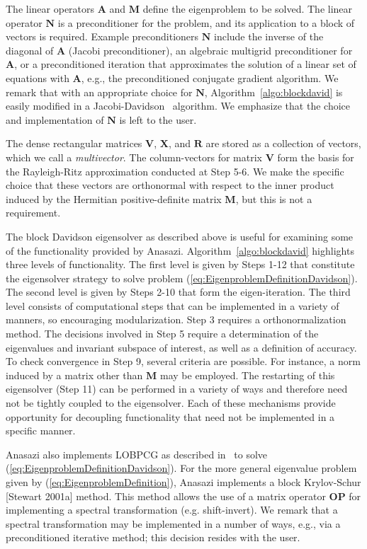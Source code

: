 \documentclass[acmtoms,acmnow]{acmtrans2m}
\begin{document}
The linear operators $\mathbf{A}$ and $\mathbf{M}$ define the
eigenproblem to be solved. The linear operator $\mathbf{N}$ is a
preconditioner for the problem, and its application to a block of
vectors is required. Example preconditioners $\mathbf{N}$ include
the inverse of the diagonal of $\mathbf{A}$ (Jacobi preconditioner),
an algebraic multigrid preconditioner for $\mathbf{A}$, or a
preconditioned iteration that approximates the solution of a linear
set of equations with $\mathbf{A}$, e.g., the preconditioned
conjugate gradient algorithm. We remark that with an appropriate
choice for $\mathbf{N}$, Algorithm~\ref{algo:blockdavid} is easily
modified in a Jacobi-Davidson~\cite{slvo:96} algorithm. We emphasize that
the choice and implementation of $\mathbf{N}$ is left to the user.

The dense rectangular matrices $\mathbf{V}$, $\mathbf{X}$, and
$\mathbf{R}$ are stored as a collection of vectors, which we call a
\emph{multivector}. 
The column-vectors for matrix $\mathbf{V}$ form
the basis for the Rayleigh-Ritz approximation conducted at Step 5-6.
We make the specific choice that these vectors are orthonormal with
respect to the inner product induced by the Hermitian
positive-definite matrix $\mathbf{M}$, but this is not a requirement.

The block Davidson eigensolver as described above is useful for examining some of the
functionality provided by Anasazi. Algorithm~\ref{algo:blockdavid} highlights three levels
of functionality. The first level is given by Steps 1-12 that constitute the eigensolver
strategy to solve problem (\ref{eq:EigenproblemDefinitionDavidson}). The second level is
given by Steps 2-10 that form the eigen-iteration. The third level consists of
computational steps that can be implemented in a variety of manners, so encouraging
modularization. Step 3 requires a orthonormalization method. The decisions involved in
Step 5 require a determination of the eigenvalues and invariant subspace of interest, as
well as a definition of accuracy. To check convergence in Step 9, several criteria are
possible. For instance, a norm induced by a matrix other than $\mathbf{M}$ may be
employed. The restarting of this eigensolver (Step 11) can be performed in a variety of
ways and therefore need not be tightly coupled to the eigensolver. Each of these
mechanisms provide opportunity for decoupling functionality that need not be implemented
in a specific manner.

Anasazi also implements LOBPCG as described in~\cite{Hetmaniuk:2006:BSL} to solve
(\ref{eq:EigenproblemDefinitionDavidson}).  For the more general eigenvalue problem given
by (\ref{eq:EigenproblemDefinition}), Anasazi implements a block Krylov-Schur [Stewart
2001a] method. This method allows the use of a matrix operator $\mathbf{OP}$ for
implementing a spectral transformation (e.g. shift-invert). We remark that a spectral
transformation may be implemented in a number of ways, e.g., via a preconditioned
iterative method; this decision resides with the user.
\end{document}
